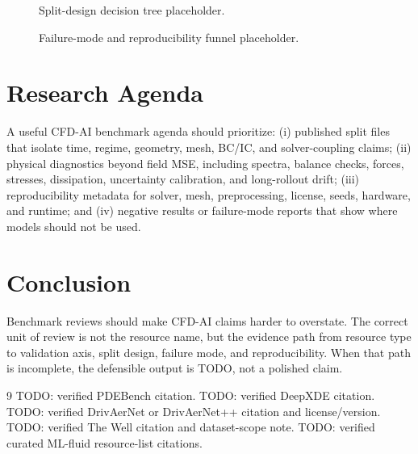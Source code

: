 \documentclass[11pt]{article}
\begin{document}
\begin{figure}[h]
\centering
{}
\caption{Split-design decision tree placeholder.}
\end{figure}

\begin{figure}[h]
\centering
{}
\caption{Failure-mode and reproducibility funnel placeholder.}
\end{figure}

\section{Research Agenda}
A useful CFD-AI benchmark agenda should prioritize: (i) published split files that isolate time, regime, geometry, mesh, BC/IC, and solver-coupling claims; (ii) physical diagnostics beyond field MSE, including spectra, balance checks, forces, stresses, dissipation, uncertainty calibration, and long-rollout drift; (iii) reproducibility metadata for solver, mesh, preprocessing, license, seeds, hardware, and runtime; and (iv) negative results or failure-mode reports that show where models should not be used.

\section{Conclusion}
Benchmark reviews should make CFD-AI claims harder to overstate. The correct unit of review is not the resource name, but the evidence path from resource type to validation axis, split design, failure mode, and reproducibility. When that path is incomplete, the defensible output is TODO, not a polished claim.

\begin{thebibliography}{9}
 TODO: verified PDEBench citation.
 TODO: verified DeepXDE citation.
 TODO: verified DrivAerNet or DrivAerNet++ citation and license/version.
 TODO: verified The Well citation and dataset-scope note.
 TODO: verified curated ML-fluid resource-list citations.
\end{thebibliography}
\end{document}
